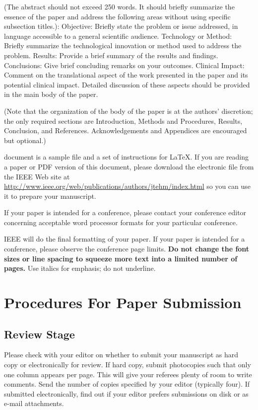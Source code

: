 (The abstract should not exceed 250 words. It should 
briefly summarize the essence of the paper and address the following areas 
without using specific subsection titles.): Objective:
Briefly state the problem or issue addressed, in language accessible to a 
general scientific audience. Technology or Method: Briefly 
summarize the technological innovation or method used to address the 
problem. Results: Provide a brief summary of the results and 
findings. Conclusions: Give brief concluding remarks on your outcomes. 
Clinical Impact: Comment on the translational aspect of the work 
presented in the paper and its potential clinical impact. Detailed 
discussion of these aspects should be provided in the main body of the 
paper.

(Note that the organization of the body of the paper is at the authors' 
discretion; the only required sections are Introduction, Methods and 
Procedures, Results, Conclusion, and References. Acknowledgements and 
Appendices are encouraged but optional.)



 document is a sample file and a set of
instructions for \LaTeX. If you are 
reading a paper or PDF version of this document, please download the 
electronic file from the IEEE Web site at 
\href{http://www.ieee.org/web/publications/authors/jtehm/index.html}
{http://www.ieee.org/web/publications/authors/jtehm/index.html}
so you can use it to prepare your manuscript.

If your paper is intended for a conference, please contact your conference 
editor concerning acceptable word processor formats for your particular 
conference. 

IEEE will do the final formatting of your paper. If your paper is intended 
for a conference, please observe the conference page limits. 
\textbf{Do not change the font sizes or 
line spacing to squeeze more text into a limited number of pages.} Use 
italics for emphasis; do not underline. 

\section{Procedures For Paper Submission}
\subsection{Review Stage}
Please check with your editor on whether to submit your manuscript as hard 
copy or electronically for review. If hard copy, submit photocopies such 
that only one column appears per page. This will give your referees plenty 
of room to write comments. Send the number of copies specified by your 
editor (typically four). If submitted electronically, find out if your 
editor prefers submissions on disk or as e-mail attachments.

